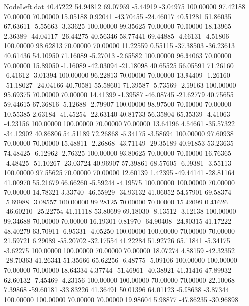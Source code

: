 \begin{filecontents}{NodeLeft.dat}
  40.47222   54.94812   69.07959    -5.44919   -3.04975  100.00000   97.42188   70.00000   70.00000   15.05188    0.92041  -43.70455  -24.46017
  40.51281   51.86035   67.63611    -5.55663   -3.33625  100.00000   99.35625   70.00000   70.00000   18.13965    2.36389  -44.04117  -26.44275
  40.56346   58.77441   69.44885    -4.66131   -4.51806  100.00000   98.62813   70.00000   70.00000   11.22559    0.55115  -37.38503  -36.23613
  40.61436   54.10950   71.16089    -5.27013   -2.65582  100.00000   96.94063   70.00000   70.00000   15.89050   -1.16089  -42.03094  -21.18098
  40.65525   56.05591   71.26160    -6.41612   -3.01394  100.00000   96.22813   70.00000   70.00000   13.94409   -1.26160  -51.18027  -24.04166
  40.70581   55.58601   71.39587    -5.73569   -2.69163  100.00000   95.69375   70.00000   70.00000   14.41399   -1.39587  -46.08745  -21.62779
  40.75655   59.44615   67.36816    -5.12688   -2.79907  100.00000   98.97500   70.00000   70.00000   10.55385    2.63184  -41.45254  -22.63140
  40.81733   56.35804   65.35339    -4.41063   -4.23156  100.00000  100.00000   70.00000   70.00000   13.64196    4.64661  -35.57322  -34.12902
  40.86806   54.51189   72.26868    -5.34175   -3.58694  100.00000   97.60938   70.00000   70.00000   15.48811   -2.26868  -43.71149  -29.35189
  40.91853   53.23635   74.48425    -6.12962   -2.76325  100.00000   93.80625   70.00000   70.00000   16.76365   -4.48425  -51.10267  -23.03724
  40.96907   57.39861   68.57605    -6.09381   -3.55113  100.00000   97.55625   70.00000   70.00000   12.60139    1.42395  -49.44141  -28.81164
  41.00970   55.21679   66.66260    -5.59244   -4.19575  100.00000  100.00000   70.00000   70.00000   14.78321    3.33740  -46.55929  -34.93132
  41.06052   54.57901   69.58374    -5.69988   -3.08557  100.00000   99.28125   70.00000   70.00000   15.42099    0.41626  -46.60210  -25.22754
  41.11118   53.80699   69.18030    -8.13512   -3.12138  100.00000   99.34688   70.00000   70.00000   16.19301    0.81970  -64.90408  -24.90315
  41.17222   48.40279   63.70911    -6.95331   -4.05250  100.00000  100.00000   70.00000   70.00000   21.59721    6.29089  -55.20702  -32.17554
  41.22284   51.92726   65.11841    -5.34175   -3.62275  100.00000  100.00000   70.00000   70.00000   18.07274    4.88159  -42.32352  -28.70363
  41.26341   51.35666   65.62256    -6.48775   -5.09106  100.00000  100.00000   70.00000   70.00000   18.64334    4.37744  -51.46961  -40.38921
  41.31416   47.89932   62.60132    -7.45469   -4.23156  100.00000  100.00000   70.00000   70.00000   22.10068    7.39868  -59.60181  -33.83226
  41.36491   50.01396   64.01123    -5.98638   -3.87344  100.00000  100.00000   70.00000   70.00000   19.98604    5.98877  -47.86235  -30.96898

\end{filecontents}
